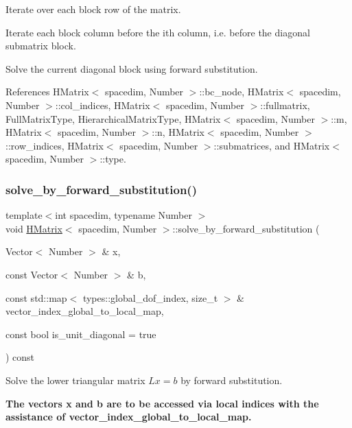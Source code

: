 Iterate over each block row of the matrix.

Iterate each block column before the i\textquotesingle{}th column, i.\+e. before the diagonal submatrix block.

Solve the current diagonal block using forward substitution.

References H\+Matrix$<$ spacedim, Number $>$\+::bc\+\_\+node, H\+Matrix$<$ spacedim, Number $>$\+::col\+\_\+indices, H\+Matrix$<$ spacedim, Number $>$\+::fullmatrix, Full\+Matrix\+Type, Hierarchical\+Matrix\+Type, H\+Matrix$<$ spacedim, Number $>$\+::m, H\+Matrix$<$ spacedim, Number $>$\+::n, H\+Matrix$<$ spacedim, Number $>$\+::row\+\_\+indices, H\+Matrix$<$ spacedim, Number $>$\+::submatrices, and H\+Matrix$<$ spacedim, Number $>$\+::type.

\mbox{\label{classHMatrix_a5ddd48bc33e45d0b4221416cbb039cc3}} 
\subsubsection{\texorpdfstring{solve\+\_\+by\+\_\+forward\+\_\+substitution()}{solve\_by\_forward\_substitution()}\hspace{0.1cm}{\footnotesize\ttfamily [4/4]}}
{\footnotesize\ttfamily template$<$int spacedim, typename Number $>$ \\
void \hyperlink{classHMatrix}{H\+Matrix}$<$ spacedim, Number $>$\+::solve\+\_\+by\+\_\+forward\+\_\+substitution (\begin{DoxyParamCaption}\item[{Vector$<$ Number $>$ \&}]{x,  }\item[{const Vector$<$ Number $>$ \&}]{b,  }\item[{const std\+::map$<$ types\+::global\+\_\+dof\+\_\+index, size\+\_\+t $>$ \&}]{vector\+\_\+index\+\_\+global\+\_\+to\+\_\+local\+\_\+map,  }\item[{const bool}]{is\+\_\+unit\+\_\+diagonal = {\ttfamily true} }\end{DoxyParamCaption}) const}

Solve the lower triangular matrix $Lx=b$ by forward substitution.

{\bfseries The vectors {\ttfamily x} and {\ttfamily b} are to be accessed via local indices with the assistance of {\ttfamily vector\+\_\+index\+\_\+global\+\_\+to\+\_\+local\+\_\+map}.}


